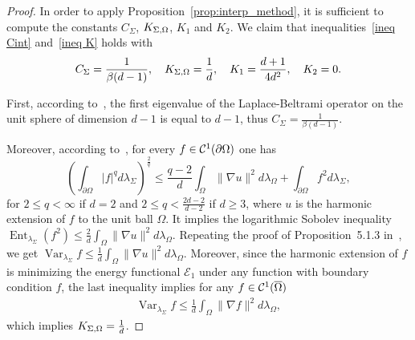 \documentclass[a4paper]{article}
\theoremstyle{definition}
\DeclareMathOperator{\Var}{Var}
\numberwithin{equation}{section}
\begin{document}
\begin{proof}
In order to apply Proposition~\ref{prop:interp_method}, it is sufficient to compute the constants $C_\Sigma$,  $K_{\Sigma,\Omega}$, $K_1$ and $K_2$. We claim that inequalities~\eqref{ineq Cint} and~\eqref{ineq K} holds with
\[ C_\Sigma =\frac{1}{\beta(d-1)}, \quad K_{\Sigma,\Omega}=\frac{1}{d}, \quad K_1= \frac{d+1}{4d^2}, \quad K_2=0. \]

First, according to~\cite[Theorem 22.1]{Shubin}, the first eigenvalue of the Laplace-Beltrami operator on the unit sphere of dimension $d-1$ is equal to $d-1$, thus $C_\Sigma=\frac{1}{\beta (d-1)}$. 

Moreover, according to~\cite[Theorem~4]{Beckner:1993}, for every $f \in \mathcal{C}^1(\partial \Omega)$ one has 
\begin{equation*} %
  \left( \int_{ \partial \Omega  }   |f|^q d\lambda_{\Sigma }  \right)^{ \frac{2}{ q }}\leq \frac{ q-2 }{ d } \int_{ \Omega}   \|\nabla u\|^2 d\lambda_\Omega+\int_{ \partial \Omega  }   f^2 d\lambda_{\Sigma },  
\end{equation*}
for $2\leq q<\infty$ if $d=2$ and $2\leq q< \frac{ 2d-2 }{ d-2 }$ if $d\geq 3$, where $u$ is the harmonic extension of $f$ to  the unit ball $\Omega$. 
It implies the logarithmic Sobolev inequality $ \operatorname{Ent}_{\lambda_\Sigma} (f^2)\leq  \frac{2}{ d }\int_{ \Omega }   \|\nabla u\|^2 d\lambda_\Omega$.
Repeating the proof of Proposition~5.1.3 in~\cite{Bakry:2014}, we get $
\Var_{\lambda_{\Sigma }} f\leq  \frac{1}{ d }\int_{ \Omega }   \|\nabla u\|^2 d\lambda_\Omega$.
Moreover, since the harmonic extension of $f$ is minimizing the energy functional $\mathcal E_1$ under any function with boundary condition $f$, the last inequality implies for any $f \in \mathcal{C}^1(\overline \Omega)$
\begin{align}
\label{equ_poincare_inequality_on_s}
\Var_{\lambda_{\Sigma }} f\leq  \frac{1}{ d }\int_{ \Omega }   \|\nabla f\|^2 d\lambda_\Omega,
\end{align}
which implies $K_{\Sigma,\Omega}=\frac{1}{d}$.


\end{proof}
\end{document}

